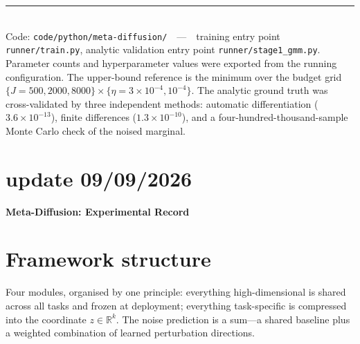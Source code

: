 \documentclass[11pt]{article}
\newcommand{\epshat}{\hat{\epsilon}}
\begin{document}
\vfill
\noindent\rule{\linewidth}{0.4pt}\\[3pt]
{\footnotesize\color{greyc}
Code: \texttt{code/python/meta-diffusion/}\ \ ---\ \ training entry point \texttt{runner/train.py},
analytic validation entry point \texttt{runner/stage1\_gmm.py}. Parameter counts and hyperparameter
values were exported from the running configuration. The upper-bound reference is the minimum over
the budget grid $\{J=500,2000,8000\}\times\{\eta=3\!\times\!10^{-4},10^{-4}\}$. The analytic ground
truth was cross-validated by three independent methods: automatic differentiation
($3.6\times10^{-13}$), finite differences ($1.3\times10^{-10}$), and a four-hundred-thousand-sample
Monte Carlo check of the noised marginal.}


\clearpage
\section*{update 09/09/2026}

\renewcommand{\epshat}{\hat{\varepsilon}}

\begin{center}
{\Large\bfseries Meta-Diffusion: Experimental Record}
\end{center}
\medskip

\begin{abstract}
\noindent
This document records the framework, the data protocol, the loss functions, every experiment run
to date, and a step-by-step procedure written so that the image experiments can be reproduced
exactly. Every figure quoted here was exported from the running code rather than recalled. The
test split has not been used for any choice at any point in the programme.
\end{abstract}

\section{Framework structure}
\label{sec:framework}

Four modules, organised by one principle: everything high-dimensional is shared across all tasks
and frozen at deployment; everything task-specific is compressed into the coordinate
$z \in \mathbb{R}^{k}$. The noise prediction is a sum---a shared baseline plus a weighted
combination of learned perturbation directions.
\end{document}
